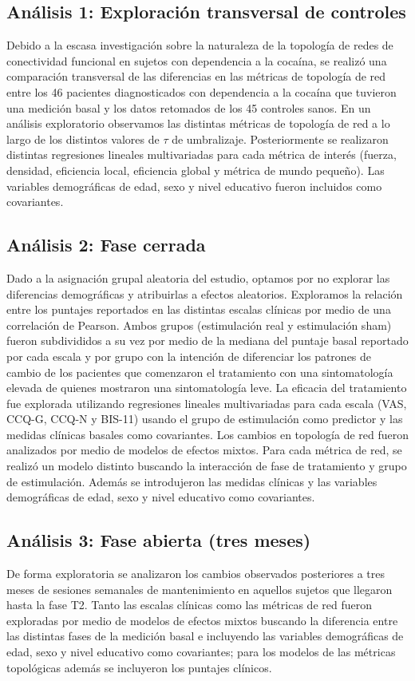 \subsection{Análisis 1: Exploración transversal de controles}
Debido a la escasa investigación sobre la naturaleza de la topología de redes de conectividad funcional en sujetos con dependencia a la cocaína, se realizó una comparación transversal de las diferencias en las métricas de topología de red entre los 46 pacientes diagnosticados con dependencia a la cocaína que tuvieron una medición basal y los datos retomados de los 45 controles sanos.
En un análisis exploratorio observamos las distintas métricas de topología de red a lo largo de los distintos valores de $\tau$ de umbralizaje. Posteriormente se realizaron distintas regresiones lineales multivariadas para cada métrica de interés (fuerza, densidad, eficiencia local, eficiencia global y métrica de mundo pequeño). Las variables demográficas de edad, sexo y nivel educativo fueron incluidos como covariantes.

\subsection{Análisis 2: Fase cerrada}
Dado a la asignación grupal aleatoria del estudio, optamos por no explorar las diferencias demográficas y atribuirlas a efectos aleatorios.
Exploramos la relación entre los puntajes reportados en las distintas escalas clínicas por medio de una correlación de Pearson.
Ambos grupos (estimulación real y estimulación sham) fueron subdivididos a su vez por medio de la mediana del puntaje basal reportado por cada escala y por grupo con la intención de diferenciar los patrones de cambio de los pacientes que comenzaron el tratamiento con una sintomatología elevada de quienes mostraron una sintomatología leve.
La eficacia del tratamiento fue explorada utilizando regresiones lineales multivariadas para cada escala (VAS, CCQ-G, CCQ-N y BIS-11) usando el grupo de estimulación como predictor y las medidas clínicas basales como covariantes.
Los cambios en topología de red fueron analizados por medio de modelos de efectos mixtos. Para cada métrica de red, se realizó un modelo distinto buscando la interacción de fase de tratamiento y grupo de estimulación. Además se introdujeron las medidas clínicas y las variables demográficas de edad, sexo y nivel educativo como covariantes.

\subsection{Análisis 3: Fase abierta (tres meses)}
De forma exploratoria se analizaron los cambios observados posteriores a tres meses de sesiones semanales de mantenimiento en aquellos sujetos que llegaron hasta la fase T2.
Tanto las escalas clínicas como las métricas de red fueron exploradas por medio de modelos de efectos mixtos buscando la diferencia entre las distintas fases de la medición basal e incluyendo las variables demográficas de edad, sexo y nivel educativo como covariantes; para los modelos de las métricas topológicas además se incluyeron los puntajes clínicos.

